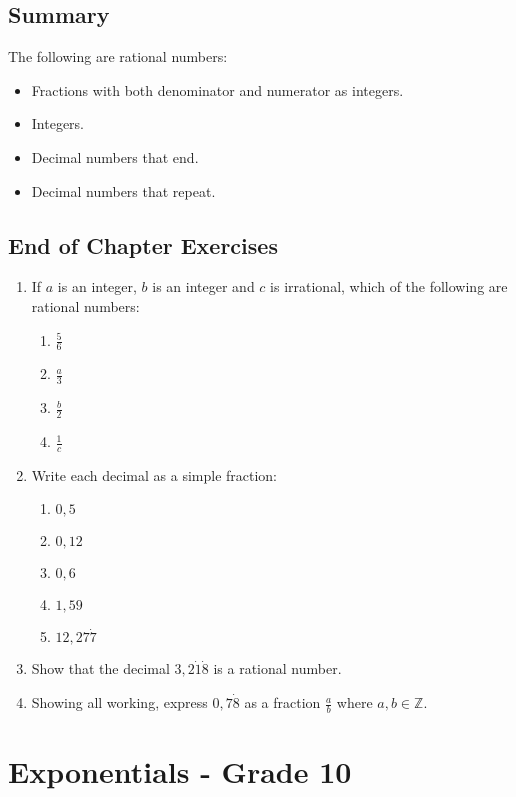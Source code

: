 \documentclass[10pt,a4paper,titlepage,twoside,openright]{report}
\begin{document}
\section{Summary}
The following are rational numbers:
\begin{itemize}
\item Fractions with both denominator and numerator as integers.
\item Integers.
\item Decimal numbers that end.
\item Decimal numbers that repeat.
\end{itemize}

\section{End of Chapter Exercises}
\begin{enumerate}
\item If $a$ is an integer, $b$ is an integer and $c$ is irrational, which of the following are rational numbers:
\begin{enumerate}
\item $\frac{5}{6}$
\item $\frac{a}{3}$
\item $\frac{b}{2}$
\item $\frac{1}{c}$
\end{enumerate}
\item Write each decimal as a simple fraction:
\begin{enumerate}
\item $0,5$
\item $0,12$
\item $0,6$
\item $1,59$
\item $12,27\dot{7}$
\end{enumerate}
\item Show that the decimal $3,2\dot1\dot8$ is a rational number.
\item Showing all working, express $0,7\dot8$ as a fraction $\frac{a}{b}$ where $a, b \in \mathbb Z$.
\end{enumerate}





\chapter{Exponentials - Grade 10}
\label{m:n:en:10}
\end{document}
